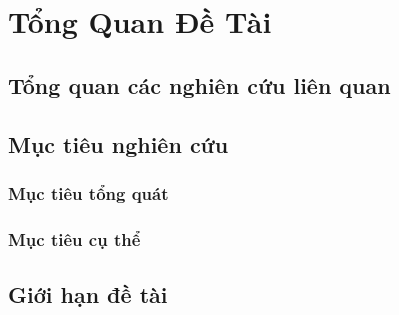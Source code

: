 \chapter{Tổng Quan Đề Tài}
\section{Tổng quan các nghiên cứu liên quan}


\section{Mục tiêu nghiên cứu}
\subsection{Mục tiêu tổng quát}
\subsection{Mục tiêu cụ thể}


\section{Giới hạn đề tài}